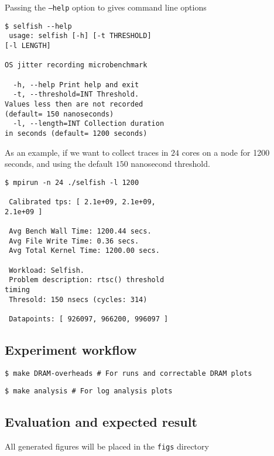 Passing the {\texttt{--help}} option to \selfish gives command line options

\begin{Verbatim}[commandchars=\\\{\},frame=single]
 $ selfish --help
 usage: selfish [-h] [-t THRESHOLD]
[-l LENGTH]

OS jitter recording microbenchmark

  -h, --help Print help and exit
  -t, --threshold=INT Threshold.
Values less then are not recorded
(default= 150 nanoseconds)
  -l, --length=INT Collection duration
in seconds (default= 1200 seconds)

\end{Verbatim}

As an example, if we want to collect \selfish traces in $24$ cores on a node for
1200 seconds, and using the default $150$ nanosecond threshold.

\begin{Verbatim}[commandchars=\\\{\},frame=single]
 $ mpirun -n 24 ./selfish -l 1200

 Calibrated tps: [ 2.1e+09, 2.1e+09,
2.1e+09 ]

 Avg Bench Wall Time: 1200.44 secs.
 Avg File Write Time: 0.36 secs.
 Avg Total Kernel Time: 1200.00 secs.

 Workload: Selfish.
 Problem description: rtsc() threshold
timing
 Thresold: 150 nsecs (cycles: 314)

 Datapoints: [ 926097, 966200, 996097 ]
\end{Verbatim}

\subsection{Experiment workflow}

{\texttt{\$ make DRAM-overheads \# For \LogGOPSim runs and correctable DRAM plots}}

{\texttt{\$ make analysis \# For log analysis plots}}
\subsection{Evaluation and expected result}

All generated figures will be placed in the {\texttt{figs}} directory


